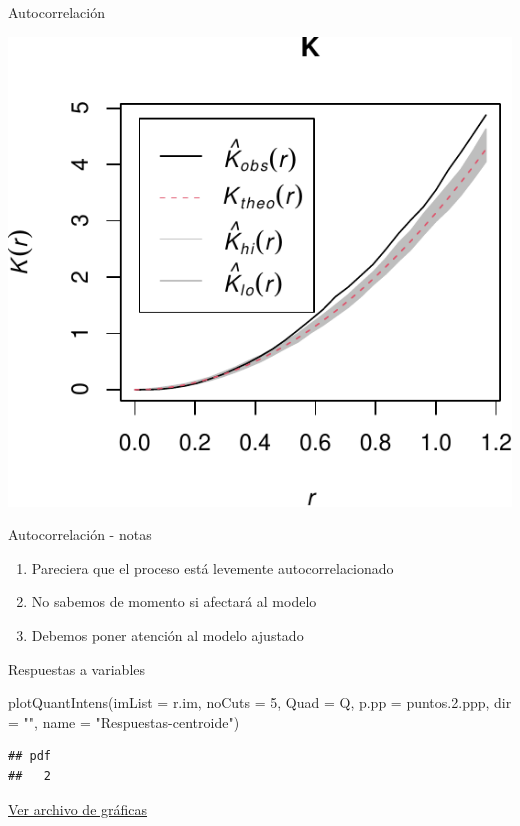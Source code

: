 \documentclass[
  11pt,
  ignorenonframetext,
]{beamer}
\newenvironment{Shaded}{}{}
\newcommand{\AttributeTok}[1]{\textcolor[rgb]{0.49,0.56,0.16}{#1}}
\newcommand{\DecValTok}[1]{\textcolor[rgb]{0.25,0.63,0.44}{#1}}
\newcommand{\FloatTok}[1]{\textcolor[rgb]{0.25,0.63,0.44}{#1}}
\newcommand{\FunctionTok}[1]{\textcolor[rgb]{0.02,0.16,0.49}{#1}}
\newcommand{\NormalTok}[1]{#1}
\newcommand{\StringTok}[1]{\textcolor[rgb]{0.25,0.44,0.63}{#1}}
\providecommand{\tightlist}{%
  \setlength{\itemsep}{0pt}\setlength{\parskip}{0pt}}
\begin{document}
\begin{frame}{Autocorrelación}
\protect\hypertarget{autocorrelaciuxf3n-1}{}
\begin{center}\includegraphics{Tutorial-spatstat-2_files/figure-beamer/unnamed-chunk-10-1} \end{center}
\end{frame}

\begin{frame}{Autocorrelación - notas}
\protect\hypertarget{autocorrelaciuxf3n---notas}{}
\begin{enumerate}
\tightlist
\item
  Pareciera que el proceso está levemente autocorrelacionado
\item
  No sabemos de momento si afectará al modelo
\item
  Debemos poner atención al modelo ajustado
\end{enumerate}
\end{frame}

\begin{frame}[fragile]{Respuestas a variables}
\protect\hypertarget{respuestas-a-variables}{}
\begin{Shaded}
\begin{Highlighting}[]
\FunctionTok{plotQuantIntens}\NormalTok{(}\AttributeTok{imList =}\NormalTok{ r.im,}
                \AttributeTok{noCuts =} \DecValTok{5}\NormalTok{,}
                \AttributeTok{Quad =}\NormalTok{ Q,}
                \AttributeTok{p.pp =}\NormalTok{ puntos.}\FloatTok{2.}\NormalTok{ppp,}
                \AttributeTok{dir =} \StringTok{""}\NormalTok{,}
                \AttributeTok{name =} \StringTok{"Respuestas{-}centroide"}\NormalTok{)}
\end{Highlighting}
\end{Shaded}

\begin{verbatim}
## pdf 
##   2
\end{verbatim}

\href{Respuestas-centroide.pdf}{Ver archivo de gráficas}
\end{frame}
\end{document}
